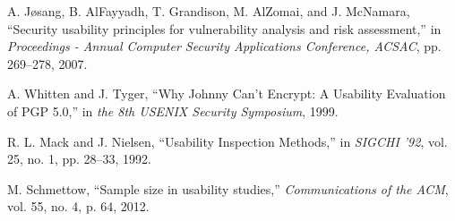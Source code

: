 \documentclass[twocolumn]{article}
\begin{document}
\begin{thebibliography}{99}
A. Jøsang, B. AlFayyadh, T. Grandison, M. AlZomai, and J. McNamara, “Security usability principles for vulnerability analysis and risk assessment,” in \textit{Proceedings - Annual Computer Security Applications Conference, ACSAC}, pp. 269–278, 2007.

A. Whitten and J. Tyger, “Why Johnny Can’t Encrypt: A Usability Evaluation of PGP 5.0,” in \textit{the 8th USENIX Security Symposium}, 1999.

R. L. Mack and J. Nielsen, “Usability Inspection Methods,” in \textit{SIGCHI ’92}, vol. 25, no. 1, pp. 28–33, 1992.

M. Schmettow, “Sample size in usability studies,” \textit{Communications of the ACM}, vol. 55, no. 4, p. 64, 2012.


\end{thebibliography}
\end{document}
